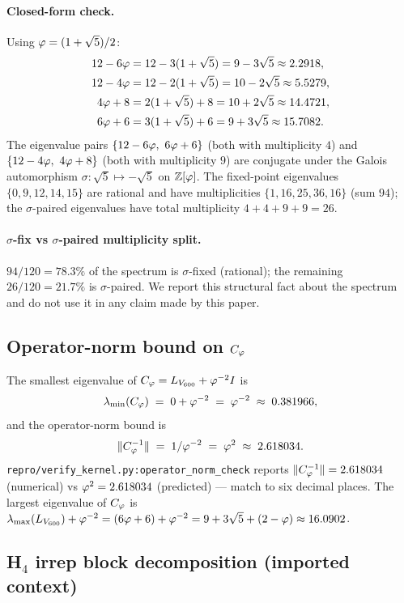 \paragraph{Closed-form check.} Using $\varphi = (1+\sqrt{5})/2$:
\begin{align*}
12 - 6\varphi &= 12 - 3(1+\sqrt{5}) = 9 - 3\sqrt{5} \approx 2.2918, \\
12 - 4\varphi &= 12 - 2(1+\sqrt{5}) = 10 - 2\sqrt{5} \approx 5.5279, \\
4\varphi + 8 &= 2(1+\sqrt{5}) + 8 = 10 + 2\sqrt{5} \approx 14.4721, \\
6\varphi + 6 &= 3(1+\sqrt{5}) + 6 = 9 + 3\sqrt{5} \approx 15.7082.
\end{align*}
The eigenvalue pairs $\{12 - 6\varphi,\ 6\varphi+6\}$ (both with multiplicity
$4$) and $\{12 - 4\varphi,\ 4\varphi+8\}$ (both with multiplicity $9$)
are conjugate under the Galois automorphism
$\sigma\colon \sqrt{5} \mapsto -\sqrt{5}$ on $\mathbb{Z}[\varphi]$. The
fixed-point eigenvalues $\{0, 9, 12, 14, 15\}$ are rational and
have multiplicities $\{1, 16, 25, 36, 16\}$ (sum $94$); the
$\sigma$-paired eigenvalues have total multiplicity $4+4+9+9 = 26$.

\paragraph{$\sigma$-fix vs $\sigma$-paired multiplicity split.}
$94/120 = 78.3\%$ of the spectrum is $\sigma$-fixed (rational); the
remaining $26/120 = 21.7\%$ is $\sigma$-paired. We report this
structural fact about the spectrum and do not use it in any claim
made by this paper.

\subsection{Operator-norm bound on $C_{\varphi}$}\label{ssec:opnorm_check}

The smallest eigenvalue of $C_{\varphi} = L_{V_{600}} + \varphi^{-2} I$ is
\[
\lambda_{\min}(C_{\varphi}) \;=\; 0 + \varphi^{-2} \;=\; \varphi^{-2}
\;\approx\; 0.381966,
\]
and the operator-norm bound is
\[
\|C_{\varphi}^{-1}\| \;=\; 1/\varphi^{-2} \;=\; \varphi^{2} \;\approx\; 2.618034.
\]
\texttt{repro/verify\_kernel.py:operator\_norm\_check} reports
$\|C_{\varphi}^{-1}\| = 2.618034$ (numerical) vs $\varphi^{2} = 2.618034$
(predicted) — match to six decimal places. The largest eigenvalue
of $C_{\varphi}$ is
$\lambda_{\max}(L_{V_{600}}) + \varphi^{-2} = (6\varphi + 6) + \varphi^{-2}
= 9 + 3\sqrt{5} + (2 - \varphi) \approx 16.0902$.

\subsection{H$_4$ irrep block decomposition (imported context)}
\label{ssec:irrep}

